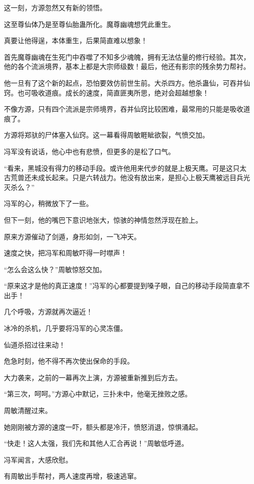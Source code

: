 \begin{this_body}
这一刻，方源忽然又有新的领悟。

这至尊仙体乃是至尊仙胎蛊所化。魔尊幽魂想凭此重生。

真要让他得逞，本体重生，后果简直难以想象！

首先魔尊幽魂在生死门中吞噬了不知多少魂魄，拥有无法估量的修行经验。其次，他的各个流派境界，基本上都是大宗师级数！最后，他还有影宗的残余势力帮衬。

他一旦有了这个新的起点，恐怕要效仿前世生前。大杀四方。他杀蛊仙，可吞并仙窍。也可吸收道痕。成长的速度，简直匪夷所思，绝对会超越想象！

不像方源，只有四个流派是宗师境界，吞并仙窍比较困难，最常用的只能是吸收道痕了。

方源将郑驮的尸体塞入仙窍。这一幕看得周敏睚眦欲裂，气愤交加。

冯军没有说话，他心中也有悲愤，但更多的是松了口气。

“看来，黑城没有得力的移动手段。或许他用来代步的就是上极天鹰。可是这只太古荒兽还未成长起来。只是六转战力。他没有放出来，是担心上极天鹰被远目兵光灭杀么？”

冯军的心，稍微放下了一些。

但下一刻，他的嘴巴下意识地张大，惊骇的神情忽然浮现在脸上。

原来方源催动了剑遁，身形如剑，一飞冲天。

速度之快，把冯军和周敏吓得一时噤声！

“怎么会这么快？”周敏惊怒交加。

“原来这才是他的真正速度！”冯军的心都要提到嗓子眼，自己的移动手段简直拿不出手！

几个呼吸，方源就再次逼近！

冰冷的杀机，几乎要将冯军的心灵冻僵。

仙道杀招过往来动！

危急时刻，他不得不再次使出保命的手段。

大力袭来，之前的一幕再次上演，方源被重新推到后方去。

“第三次，呵呵。”方源心中默记，三扑未中，他毫无挫败之感。

周敏清醒过来。

她刚刚被方源的速度一吓，额头都是冷汗，愤怒消退，惊惧涌起。

“快走！这人太强，我们先和其他人汇合再说！”周敏低呼道。

冯军闻言，大感欣慰。

有周敏出手帮衬，两人速度再增，极速逃窜。


\end{this_body}
